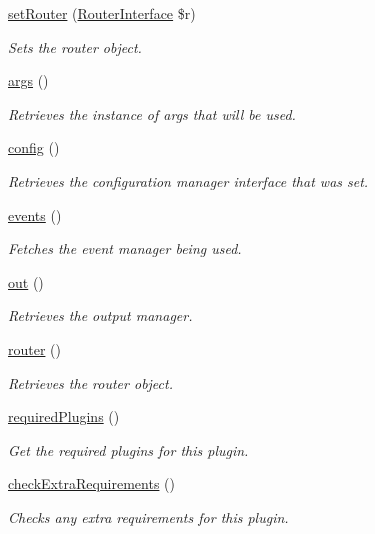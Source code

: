 \begin{DoxyCompactItemize}
\hyperlink{classGenericPlugin_ac03553d95ea0e2d5023e3f78ef85f4b9}{set\-Router} (\hyperlink{interfaceRouterInterface}{Router\-Interface} \$r)
\begin{DoxyCompactList}\small\item\em Sets the router object. \end{DoxyCompactList}\item 
\hyperlink{classGenericPlugin_a1ce2fea9e153e37e019ff4b72fd3b819}{args} ()
\begin{DoxyCompactList}\small\item\em Retrieves the instance of args that will be used. \end{DoxyCompactList}\item 
\hyperlink{classGenericPlugin_aa7c4a335f37ee83cd131be29ed469c82}{config} ()
\begin{DoxyCompactList}\small\item\em Retrieves the configuration manager interface that was set. \end{DoxyCompactList}\item 
\hyperlink{classGenericPlugin_ab7d46f8bdaf1540eee1b988073294298}{events} ()
\begin{DoxyCompactList}\small\item\em Fetches the event manager being used. \end{DoxyCompactList}\item 
\hyperlink{classGenericPlugin_a005937e2c819abbb56fdc4b10fdeb666}{out} ()
\begin{DoxyCompactList}\small\item\em Retrieves the output manager. \end{DoxyCompactList}\item 
\hyperlink{classGenericPlugin_adc6c23c436e9979ed2c5b07dde6f3931}{router} ()
\begin{DoxyCompactList}\small\item\em Retrieves the router object. \end{DoxyCompactList}\item 
\hyperlink{classGenericPlugin_a32850f8424953482ef2b07df130941cf}{required\-Plugins} ()
\begin{DoxyCompactList}\small\item\em Get the required plugins for this plugin. \end{DoxyCompactList}\item 
\hyperlink{classGenericPlugin_a53983a917eccd1ee4b06355f688c0960}{check\-Extra\-Requirements} ()
\begin{DoxyCompactList}\small\item\em Checks any extra requirements for this plugin. \end{DoxyCompactList}\end{DoxyCompactItemize}
